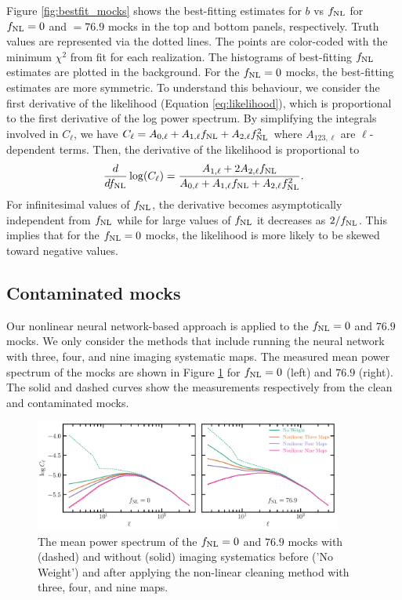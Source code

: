 Figure \ref{fig:bestfit_mocks} shows the best-fitting estimates for $b$ vs $f_{\rm NL}$ for $f_{\rm NL}=0$ and $=76.9$ mocks in the top and bottom panels, respectively. Truth values are represented via the dotted lines. The points are color-coded with the minimum $\chi^{2}$ from fit for each realization. The histograms of best-fitting $f_{\rm NL}$ estimates are plotted in the background. For the $f_{\rm NL}=0$ mocks, the best-fitting estimates are more symmetric. To understand this behaviour, we consider the first derivative of the likelihood (Equation \ref{eq:likelihood}), which is proportional to the first derivative of the log power spectrum. By simplifying the integrals involved in $C_{\ell}$, we have $C_{\ell} = A_{0, \ell} + A_{1,\ell} f_{\rm NL} + A_{2, \ell} f_{\rm NL}^{2}$ where $A_{123,\ell}$ are $\ell$-dependent terms. Then, the derivative of the likelihood is proportional to
\begin{equation}
    \frac{d}{df_{\rm NL}}\log(C_{\ell}) = \frac{A_{1, \ell}+2A_{2, \ell}f_{\rm NL}}{A_{0, \ell} + A_{1,\ell} f_{\rm NL} + A_{2, \ell} f_{\rm NL}^{2}}.
\end{equation}
For infinitesimal values of $f_{\rm NL}$, the derivative becomes asymptotically independent from $f_{\rm NL}$ while for large values of $f_{\rm NL}$ it decreases as $2/f_{\rm NL}$. This implies that for the $f_{\rm NL}=0$ mocks, the likelihood is more likely to be skewed toward negative values.

\subsection{Contaminated mocks}\label{ssec:contmocks}
Our nonlinear neural network-based approach is applied to the $f_{\rm NL}=0$ and $76.9$ mocks. We only consider the methods that include running the neural network with three, four, and nine imaging systematic maps. The measured mean power spectrum of the mocks are shown in Figure \ref{fig:clmocks} for $f_{\rm NL}=0$ (left) and $76.9$ (right). The solid and dashed curves show the measurements respectively from the clean and contaminated mocks.

\begin{figure}
    \centering
    \includegraphics[width=0.9\textwidth]{figures/clmocks.pdf}
    \caption{The mean power spectrum of the $f_{\rm NL} =0$ and $76.9$ mocks with (dashed) and without (solid) imaging systematics before ('No Weight') and after applying the non-linear cleaning method with three, four, and nine maps.}\label{fig:clmocks}
\end{figure}


